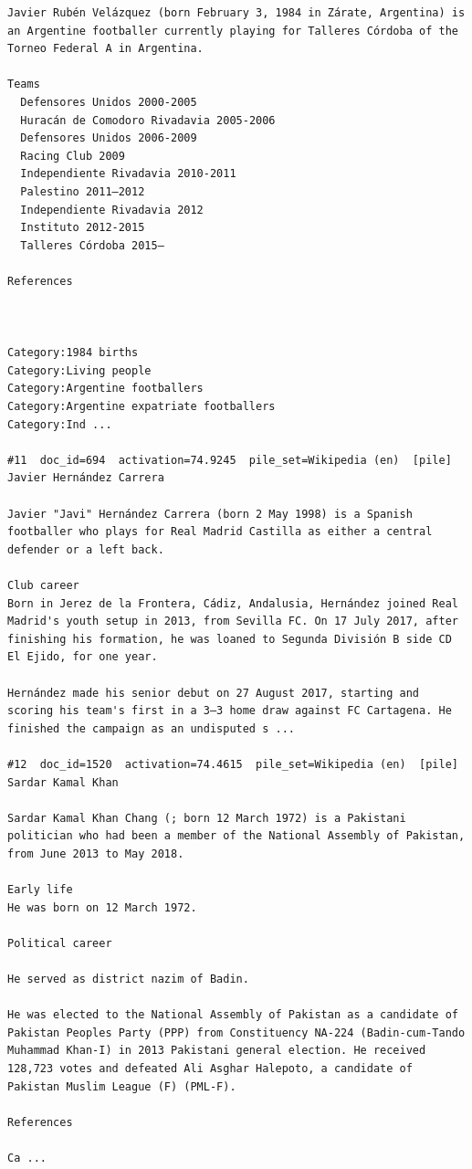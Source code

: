 \begin{verbatim}
Javier Rubén Velázquez (born February 3, 1984 in Zárate, Argentina) is an Argentine footballer currently playing for Talleres Córdoba of the Torneo Federal A in Argentina.

Teams
  Defensores Unidos 2000-2005
  Huracán de Comodoro Rivadavia 2005-2006
  Defensores Unidos 2006-2009
  Racing Club 2009
  Independiente Rivadavia 2010-2011
  Palestino 2011–2012
  Independiente Rivadavia 2012
  Instituto 2012-2015
  Talleres Córdoba 2015–

References
 
 

Category:1984 births
Category:Living people
Category:Argentine footballers
Category:Argentine expatriate footballers
Category:Ind ...

#11  doc_id=694  activation=74.9245  pile_set=Wikipedia (en)  [pile]
Javier Hernández Carrera

Javier "Javi" Hernández Carrera (born 2 May 1998) is a Spanish footballer who plays for Real Madrid Castilla as either a central defender or a left back.

Club career
Born in Jerez de la Frontera, Cádiz, Andalusia, Hernández joined Real Madrid's youth setup in 2013, from Sevilla FC. On 17 July 2017, after finishing his formation, he was loaned to Segunda División B side CD El Ejido, for one year.

Hernández made his senior debut on 27 August 2017, starting and scoring his team's first in a 3–3 home draw against FC Cartagena. He finished the campaign as an undisputed s ...

#12  doc_id=1520  activation=74.4615  pile_set=Wikipedia (en)  [pile]
Sardar Kamal Khan

Sardar Kamal Khan Chang (; born 12 March 1972) is a Pakistani politician who had been a member of the National Assembly of Pakistan, from June 2013 to May 2018.

Early life
He was born on 12 March 1972.

Political career

He served as district nazim of Badin.

He was elected to the National Assembly of Pakistan as a candidate of Pakistan Peoples Party (PPP) from Constituency NA-224 (Badin-cum-Tando Muhammad Khan-I) in 2013 Pakistani general election. He received 128,723 votes and defeated Ali Asghar Halepoto, a candidate of Pakistan Muslim League (F) (PML-F).

References

Ca ...


\end{verbatim}
